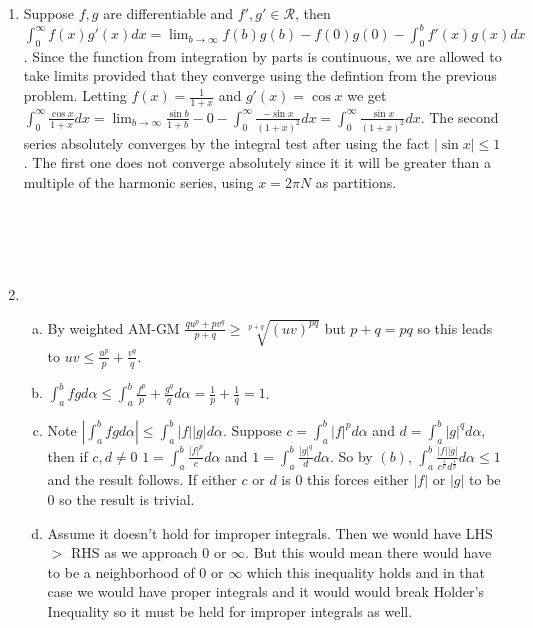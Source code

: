 \documentclass{article}
\begin{document}
\begin{enumerate}
\item Suppose $f, g$ are differentiable and $f',g'\in \mathcal{R}$, then $\displaystyle\int_{0}^\infty f(x) g'(x) dx = \lim_{b\rightarrow\infty} f(b)g(b) - f(0)g(0) - \int_{0}^{b} f'(x) g(x) dx$. Since the function from integration by parts is continuous, we are allowed to take limits provided that they converge using the defintion from the previous problem. Letting $f(x) =\frac{1}{1+x}$ and $g'(x) = \cos x$ we get $\displaystyle\int_{0}^\infty \frac{\cos x}{1+x} dx = \lim_{b\rightarrow\infty} \frac{\sin b}{1+b} - 0 - \displaystyle\int_{0}^\infty \frac{-\sin x}{(1+x)^2} dx=\displaystyle\int_{0}^\infty \frac{\sin x}{(1+x)^2} dx$. The second series absolutely converges by the integral test after using the fact $|\sin x| \leq 1$. The first one does not converge absolutely since it it will be greater than a multiple of the harmonic series, using $x=2\pi N$ as partitions.\\
\\
\\
\\
\\
\item 
\begin{enumerate}[(a)]
\item By weighted AM-GM $\frac{qu^p+pv^q}{p+q}\geq \sqrt[p+q]{(uv)^{pq}}$ but $p+q=pq$ so this leads to $uv\leq \frac{u^p}{p}+\frac{v^q}{q}$.\\
\item $\displaystyle\int_{a}^{b} fg d\alpha \leq \int_{a}^{b} \frac{f^p}{p}+\frac{g^q}{q} d\alpha= \frac{1}{p}+\frac{1}{q}=1$. \\
\item Note $\left|\displaystyle\int_{a}^{b} fg d\alpha\right|\leq \displaystyle\int_{a}^{b} |f||g| d\alpha$. Suppose $c=\displaystyle\int_{a}^{b} |f|^p d\alpha$ and $d=\displaystyle\int_{a}^{b} |g|^q d\alpha$, then if $c,d\neq 0$ $1=\displaystyle\int_{a}^{b} \frac{|f|^p}{c} d\alpha$ and  $1=\displaystyle\int_{a}^{b} \frac{|g|^q}{d} d\alpha$. So by $(b)$, $\displaystyle\int_{a}^{b} \frac{|f||g|}{c^{\frac{1}{p}} d^{\frac{1}{p}}} d\alpha\leq 1$ and the result follows. If either $c$ or $d$ is $0$ this forces either $|f|$ or $|g|$ to be $0$ so the result is trivial.
\item Assume it doesn't hold for improper integrals. Then we would have LHS $>$ RHS as we approach $0$ or $\infty$. But this would mean there would have to be a neighborhood of $0$ or $\infty$ which this inequality holds and in that case we would have proper integrals and it would would break Holder's Inequality so it must be held for improper integrals as well.

\end{enumerate}
\end{enumerate}
\end{document}
